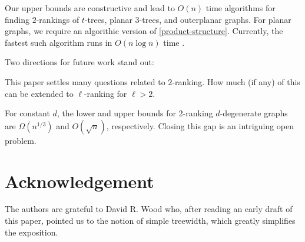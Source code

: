\documentclass[kpfonts]{patmorin}
\theoremstyle{named}
\begin{document}
Our upper bounds are constructive and lead to $O(n)$ time algorithms for finding $2$-rankings of $t$-trees, planar 3-trees, and outerplanar graphs.  For planar graphs, we require an algorithic version of \cref{product-structure}. Currently, the fastest such algorithm runs in $O(n\log n)$ time \cite{morin:fast}.

Two directions for future work stand out:
\begin{inparaenum}[(i)]
    \item This paper settles many questions related to $2$-ranking.  How much (if any) of this can be extended to $\ell$-ranking for $\ell>2$.
    \item For constant $d$, the lower and upper bounds for 2-ranking $d$-degenerate graphs are $\Omega(n^{1/3})$ and $O(\sqrt{n})$, respectively.  Closing this gap is an intriguing open problem.
\end{inparaenum}

%
%

\section*{Acknowledgement}

The authors are grateful to David R. Wood who, after reading an early draft of this paper, pointed us to the notion of simple treewidth, which greatly simplifies the exposition.




\end{document}

